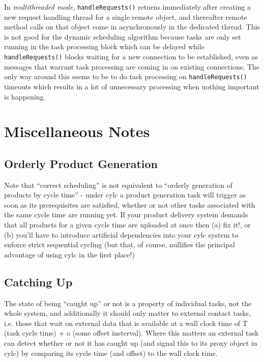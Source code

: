 \documentclass[11pt,a4paper]{article}
\begin{document}
In {\em multithreaded mode}, \verb#handleRequests()# returns immediately
after creating a new request handling thread for a single remote object,
and thereafter remote method calls on that object come in asynchronously
in the dedicated thread. This is not good for the dynamic scheduling
algorithm because tasks are only set running in the task processing
block which can be delayed while \verb#handleRequests()# blocks waiting
for a new connection to be established, even as messages that warrant
task processing are coming in on existing connections. The only way
around this seems to be to do task processing on \verb#handleRequests()#
timeouts which results in a lot of unnecessary processing when nothing
important is happening.


\section{Miscellaneous Notes}

\subsection{Orderly Product Generation}

Note that ``correct scheduling'' is not equivalent to ``orderly
generation of products by cycle time'' - under cylc a product
generation task will trigger as soon as its prerequisites are satisfied,
whether or not other tasks associated with the same cycle time are
running yet.  If your product delivery system demands that all products
for a given cycle time are uploaded at once then (a) fix it!, or (b)
you'll have to introduce artificial dependencies into your cylc system
to enforce strict sequential cycling (but that, of course, nullifies the
principal advantage of using cylc in the first place!)

\subsection{Catching Up}

The state of being ``caught up'' or not is a property of individual
tasks, not the whole system, and additionally it should only matter to
external contact tasks, i.e. those that wait on external data that is
available at a wall clock time of T (task cycle time) + o (some offset
insterval). Where this matters an external task can detect whether or
not it has caught up (and signal this to its proxy object in cylc) by
comparing its cycle time (and offset) to the wall clock time.
\end{document}
